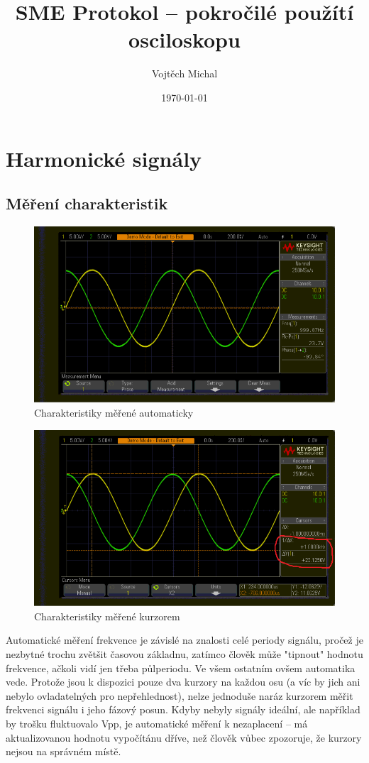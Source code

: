\documentclass[twoside]{article}
\title{SME Protokol -- pokročilé použítí osciloskopu}
\author{Vojtěch Michal}
\date{\today}
\begin{document}
\maketitle

\section{Harmonické signály}

\subsection{Měření charakteristik}
\begin{figure}[htbp]
	\centering
	\includegraphics[width=.6\linewidth]{sinus_frek_pp_automatika.png}
\caption{Charakteristiky měřené automaticky}
\end{figure}

\begin{figure}[htbp]
	\centering
	\includegraphics[width=.6\linewidth]{sinus_frek_pp_kurzor.png              }
	\caption{Charakteristiky měřené kurzorem}
\end{figure}

Automatické měření frekvence je závislé na znalosti celé periody signálu, pročež je nezbytné trochu zvětšit časovou základnu,
zatímco člověk může "tipnout" hodnotu frekvence, ačkoli vidí jen třeba půlperiodu. Ve všem ostatním ovšem automatika vede.
Protože jsou k dispozici pouze dva kurzory na každou osu (a víc by jich ani nebylo ovladatelných pro nepřehlednost),
nelze jednoduše naráz kurzorem měřit frekvenci signálu i jeho fázový posun.
Kdyby nebyly signály ideální, ale například by trošku fluktuovalo Vpp, je automatické měření k nezaplacení -- má aktualizovanou 
hodnotu vypočítánu dříve, než člověk vůbec zpozoruje, že kurzory nejsou na správném místě.
\end{document}
